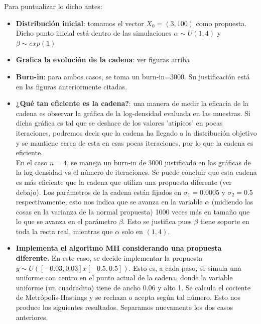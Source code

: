 \documentclass[letterpaper]{article}
\newcommand{\1}{\mathds{1}}
\theoremstyle{definition}
\theoremstyle{definition}
\theoremstyle{definition}
\theoremstyle{definition}
\theoremstyle{definition}
\begin{document}
Para puntualizar lo dicho antes:
\begin{itemize}
    \item \textbf{Distribución inicial}: tomamos el vector $X_0=(3,100)$ como propuesta. Dicho punto inicial está dentro de las simulaciones $\alpha\sim U(1,4)$ y $\beta\sim exp(1)$
    \item \textbf{Grafica la evolución de la cadena}: ver figuras arriba
    \item \textbf{Burn-in}: para ambos casos, se toma un burn-in=3000. Su justificación está en las figuras anteriormente citadas.
    \item \textbf{¿Qué tan eficiente es la cadena?}: una manera de medir la eficacia de la cadena es observar la gráfica de la log-densidad evaluada en las muestras. Si
     dicha gráfica es tal que se deshace de los valores 'atípicos' en pocas iteraciones, podremos decir que la cadena ha llegado a la distribución objetivo y se mantiene 
    cerca de esta en esas pocas iteraciones, por lo que la cadena es eficiente.\\
    
    En el caso $n=4$, se maneja un burn-in de 3000 justificado en las gráficas de la log-densidad vs el número de iteraciones. Se puede concluir que esta cadena es más
    eficiente que la cadena que utiliza una propuesta diferente (ver debajo). Los parámetros de la cadena están fijados en $\sigma_1=0.0005$ y $\sigma_2=0.5$ respectivamente,
    esto nos indica que se avanza en la variable $\alpha$ (midiendo las cosas en la varianza de la normal propuesta) 1000 veces más en tamaño que lo que se avanza en 
    el parámetro $\beta$. Esto se justifica pues $\beta$ tiene soporte en toda la recta real, mientras que $\alpha$ solo en $(1,4)$.

    \item \textbf{Implementa el algoritmo MH considerando una propuesta diferente.}
    En este caso, se decide implementar la propuesta $y\sim U \left( [-0.03,0.03]x[-0.5,0.5] \right)$.
    Esto es, a cada paso, se simula una uniforme con centro en el punto actual de la cadena, donde 
    la variable uniforme (un cuadradito) tiene de ancho 0.06 y alto 1. Se calcula el cociente 
    de Metrópolis-Hastings y se rechaza o acepta según tal número. Esto nos produce los siguientes resultados.
    Separamos nuevamente los dos casos anteriores. 
\end{itemize}
\end{document}
